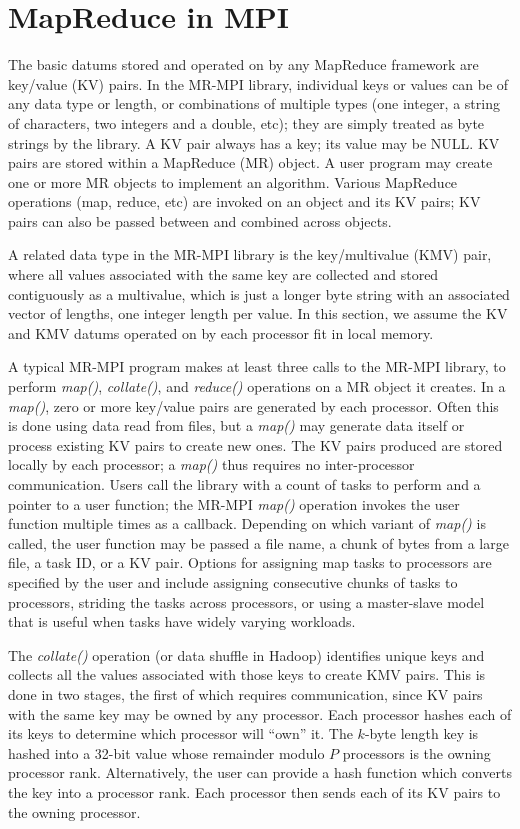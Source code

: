 \section{MapReduce in MPI}
\label{sec:mr}

The basic datums stored and operated on by any MapReduce framework are
key/value (KV) pairs.  In the MR-MPI library, individual keys or
values can be of any data type or length, or combinations of multiple
types (one integer, a string of characters, two integers and a double,
etc); they are simply treated as byte strings by the library.  A KV
pair always has a key; its value may be NULL.  KV pairs are stored
within a MapReduce (MR) object.  A user program may create one or more
MR objects to implement an algorithm.  Various MapReduce operations
(map, reduce, etc) are invoked on an object and its KV pairs; KV pairs
can also be passed between and combined across objects.

A related data type in the MR-MPI library is the key/multivalue (KMV)
pair, where all values associated with the same key are collected and
stored contiguously as a multivalue, which is just a longer byte
string with an associated vector of lengths, one integer length per
value.  In this section, we assume the KV and KMV datums operated on
by each processor fit in local memory.

A typical MR-MPI program makes at least three calls to the MR-MPI
library, to perform {\it map()}, {\it collate()}, and {\it reduce()}
operations on a MR object it creates.  In a {\it map()}, zero or more
key/value pairs are generated by each processor.  Often this is done
using data read from files, but a {\it map()} may generate data itself
or process existing KV pairs to create new ones.  The KV pairs
produced are stored locally by each processor; a {\it map()} thus
requires no inter-processor communication.  Users call the library
with a count of tasks to perform and a pointer to a user function; the
MR-MPI {\it map()} operation invokes the user function multiple times
as a callback.  Depending on which variant of {\it map()} is called,
the user function may be passed a file name, a chunk of bytes from a
large file, a task ID, or a KV pair.  Options for assigning map tasks
to processors are specified by the user and include assigning
consecutive chunks of tasks to processors, striding the tasks across
processors, or using a master-slave model that is useful when tasks
have widely varying workloads.

The {\it collate()} operation (or data shuffle in Hadoop) identifies
unique keys and collects all the values associated with those keys to
create KMV pairs.  This is done in two stages, the first of which
requires communication, since KV pairs with the same key may be owned
by any processor.  Each processor hashes each of its keys to determine
which processor will ``own'' it.  The $k$-byte length key is hashed
into a 32-bit value whose remainder modulo $P$ processors is the
owning processor rank.  Alternatively, the user can provide a hash
function which converts the key into a processor rank.  Each processor
then sends each of its KV pairs to the owning processor.

